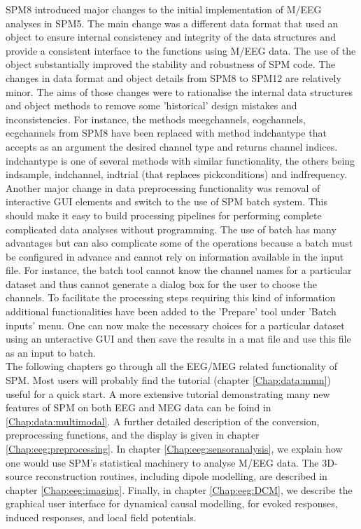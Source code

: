 SPM8 introduced major changes to the initial implementation of M/EEG analyses in SPM5. The main change was a different data format that used an object to ensure internal consistency and integrity of the data structures and provide a consistent interface to the functions using M/EEG data. The use of the object substantially improved  the stability and robustness of SPM code. The changes in data format and object details from SPM8 to SPM12 are relatively minor. The aims of those changes were to rationalise the internal data  structures and object methods to remove some 'historical' design mistakes and inconsistencies. For instance, the methods meegchannels, eogchannels, ecgchannels from SPM8 have been replaced with method indchantype that accepts as an argument the desired channel type and returns channel indices. indchantype is one of several methods with similar functionality, the others being indsample, indchannel, indtrial (that replaces pickconditions) and indfrequency.
\\
Another major change in data preprocessing functionality was removal of interactive GUI elements and switch to the use of SPM batch system. This should make it easy to build processing pipelines for performing complete complicated data analyses without programming. The use of batch has many advantages but can also complicate some of the operations because a batch must be configured in advance and cannot rely on information available in the input file. For instance, the batch tool cannot know the channel names for a particular dataset and thus cannot generate a dialog box for the user to choose the channels. To facilitate the processing steps requiring this kind of information additional functionalities have been added to the 'Prepare' tool under 'Batch inputs' menu. One can now make the necessary choices for a particular dataset using an unteractive GUI and then save the results in a mat file and use this file as an input to batch. 
\\
The following chapters go through all the EEG/MEG related functionality of SPM. Most users will probably find the tutorial (chapter \ref{Chap:data:mmn}) useful for a quick start. A more extensive tutorial demonstrating many new features of SPM on both EEG and MEG data can be foind in \ref{Chap:data:multimodal}. A further detailed description of the conversion, preprocessing functions, and the display is given in chapter \ref{Chap:eeg:preprocessing}. In chapter \ref{Chap:eeg:sensoranalysis}, we explain how one would use SPM's statistical machinery to analyse M/EEG data. The 3D-source reconstruction routines, including dipole modelling, are described in chapter \ref{Chap:eeg:imaging}. Finally, in chapter \ref{Chap:eeg:DCM}, we describe the graphical user interface for dynamical causal modelling, for evoked responses, induced responses, and local field potentials.
